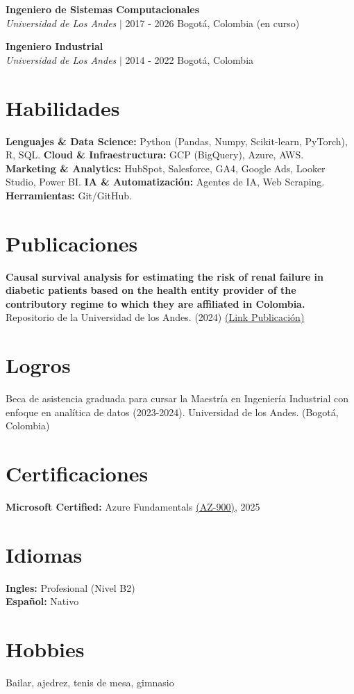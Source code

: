 \documentclass[9pt, letterpaper]{extarticle}
\begin{document}
        \vspace{10pt}

        \textbf{Ingeniero de Sistemas Computacionales} \\
        \textit{Universidad de Los Andes} $\vert$ 2017 - 2026 Bogotá, Colombia (en curso)

        \vspace{10pt}

        \textbf{Ingeniero Industrial} \\
        \textit{Universidad de Los Andes} $\vert$ 2014 - 2022 Bogotá, Colombia

    \section*{Habilidades}
        \textbf{Lenguajes \& Data Science:} Python (Pandas, Numpy, Scikit-learn, PyTorch), R, SQL.
        \textbf{Cloud \& Infraestructura:} GCP (BigQuery), Azure, AWS.
        \textbf{Marketing \& Analytics:} HubSpot, Salesforce, GA4, Google Ads, Looker Studio, Power BI.
        \textbf{IA \& Automatización:} Agentes de IA, Web Scraping.
        \textbf{Herramientas:} Git/GitHub. 
        
    \section*{Publicaciones}
        \textbf{Causal survival analysis for estimating the risk of renal failure in diabetic patients based on the health entity provider of the contributory regime to which they are affiliated in Colombia.} \\
        Repositorio de la Universidad de los Andes. (2024) \href{https://hdl.handle.net/1992/75234}{(Link Publicación)}
        
    \section*{Logros}
        Beca de asistencia graduada para cursar la Maestría en Ingeniería Industrial con enfoque en analítica de datos (2023-2024). Universidad de los Andes. (Bogotá, Colombia)

    \section*{Certificaciones}
        \textbf{Microsoft Certified:} Azure Fundamentals \href{https://learn.microsoft.com/es-es/users/jhonvega-6603/credentials/7704dbc5a72d05f?ref=https%3A%2F%2Fwww.google.com%2F}{(AZ-900)}, 2025

    \section*{Idiomas}
        \textbf{Ingles:} Profesional (Nivel B2) \\
        \textbf{Español:} Nativo

    \section*{Hobbies}
        Bailar, ajedrez, tenis de mesa, gimnasio
\end{document}
